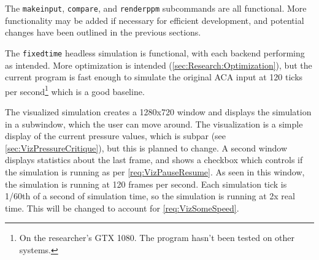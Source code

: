 The \texttt{makeinput}, \texttt{compare}, and \texttt{renderppm} subcommands are all functional.
More functionality may be added if necessary for efficient development, and potential changes have been outlined in the previous sections.

The \texttt{fixedtime} headless simulation is functional, with each backend performing as intended. More optimization is intended (\cref{sec:Research:Optimization}), but the current program is fast enough to simulate the original ACA input at 120 ticks per second\footnote{On the researcher's GTX 1080. The program hasn't been tested on other systems.} which is a good baseline.


The visualized simulation creates a 1280x720 window and displays the simulation in a subwindow, which the user can move around.
The visualization is a simple display of the current pressure values, which is subpar (see \cref{sec:VizPressureCritique}), but this is planned to change.
A second window displays statistics about the last frame, and shows a checkbox which controls if the simulation is running as per \cref{req:VizPauseResume}.
As seen in this window, the simulation is running at 120 frames per second.
Each simulation tick is 1/60th of a second of simulation time, so the simulation is running at 2x real time.
This will be changed to account for \cref{req:VizSomeSpeed}.

